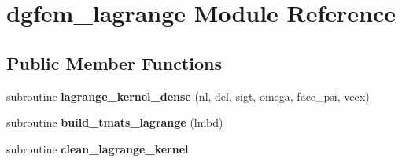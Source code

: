 \hypertarget{classdgfem__lagrange}{\section{dgfem\-\_\-lagrange Module Reference}
\label{classdgfem__lagrange}
}
\subsection*{Public Member Functions}
\begin{DoxyCompactItemize}
\item 
\hypertarget{classdgfem__lagrange_a0b4b6c03d5fe6cff201e83b0a5db5219}{subroutine {\bfseries lagrange\-\_\-kernel\-\_\-dense} (nl, del, sigt, omega, face\-\_\-psi, vecx)}\label{classdgfem__lagrange_a0b4b6c03d5fe6cff201e83b0a5db5219}

\item 
\hypertarget{classdgfem__lagrange_af849c6d2c93fe160b21d315657c33c11}{subroutine {\bfseries build\-\_\-tmats\-\_\-lagrange} (lmbd)}\label{classdgfem__lagrange_af849c6d2c93fe160b21d315657c33c11}

\item 
\hypertarget{classdgfem__lagrange_a57c2ffcc08895d26e6f8f5c5cd621337}{subroutine {\bfseries clean\-\_\-lagrange\-\_\-kernel}}\label{classdgfem__lagrange_a57c2ffcc08895d26e6f8f5c5cd621337}

\end{DoxyCompactItemize}
